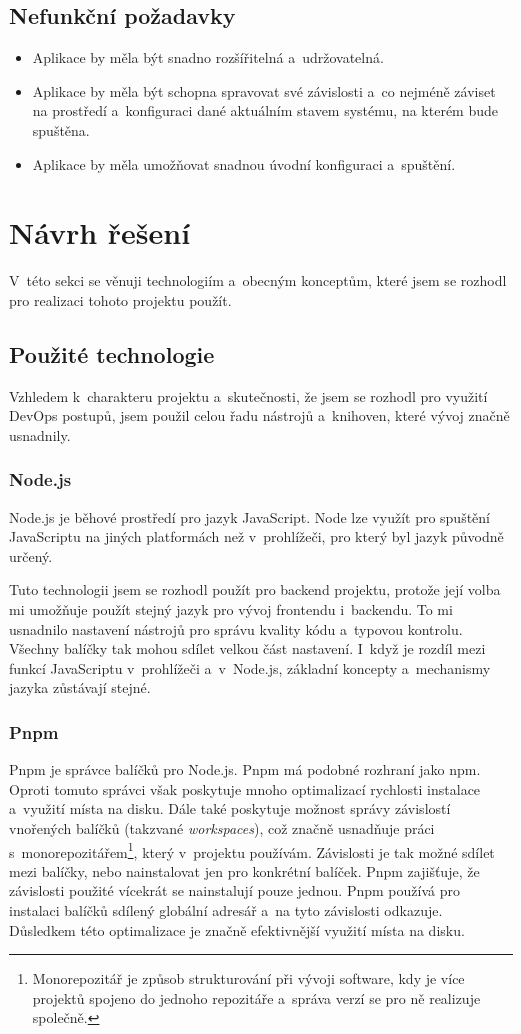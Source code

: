 \documentclass[
  tables=false,
  glossaries,
  index
]{kidiplom}
\begin{document}
\subsection{Nefunkční požadavky}
\begin{itemize}
	\item Aplikace by měla být snadno rozšířitelná a~udržovatelná.
	\item Aplikace by měla být schopna spravovat své závislosti a~co nejméně záviset na prostředí a~konfiguraci dané aktuálním stavem systému, na kterém bude spuštěna.
	\item Aplikace by měla umožňovat snadnou úvodní konfiguraci a~spuštění.
\end{itemize}

\section{Návrh řešení}
V~této sekci se věnuji technologiím a~obecným konceptům, které jsem se rozhodl pro realizaci tohoto projektu použít.

\subsection{Použité technologie}
Vzhledem k~charakteru projektu a~skutečnosti, že jsem se rozhodl pro využití DevOps postupů, jsem použil celou řadu nástrojů a~knihoven, které vývoj značně usnadnily.
\subsubsection{Node.js}
Node.js\cite{nodejs} je běhové prostředí pro jazyk JavaScript. Node lze využít pro spuštění JavaScriptu na jiných platformách než v~prohlížeči, pro který byl jazyk původně určený.

Tuto technologii jsem se rozhodl použít pro backend projektu, protože její volba mi umožňuje použít stejný jazyk pro vývoj frontendu i~backendu. To mi usnadnilo nastavení nástrojů pro správu kvality kódu a~typovou kontrolu. Všechny balíčky tak mohou sdílet velkou část nastavení. I~když je rozdíl mezi funkcí JavaScriptu v~prohlížeči a~v~Node.js, základní koncepty a~mechanismy jazyka zůstávají stejné.
\subsubsection{Pnpm}
Pnpm\cite{pnpm} je správce balíčků pro Node.js. Pnpm má podobné rozhraní jako npm. Oproti tomuto správci však poskytuje mnoho optimalizací rychlosti instalace a~využití místa na disku. Dále také poskytuje možnost správy závislostí vnořených balíčků (takzvané \emph{workspaces}), což značně usnadňuje práci s~monorepozitářem\footnote{Monorepozitář je způsob strukturování při vývoji software, kdy je více projektů spojeno do jednoho repozitáře a~správa verzí se pro ně realizuje společně.}, který v~projektu používám. Závislosti je tak možné sdílet mezi balíčky, nebo nainstalovat jen pro konkrétní balíček. Pnpm zajišťuje, že závislosti použité vícekrát se nainstalují pouze jednou. Pnpm používá pro instalaci balíčků sdílený globální adresář a~na tyto závislosti odkazuje. Důsledkem této optimalizace je značně efektivnější využití místa na disku.
\end{document}
